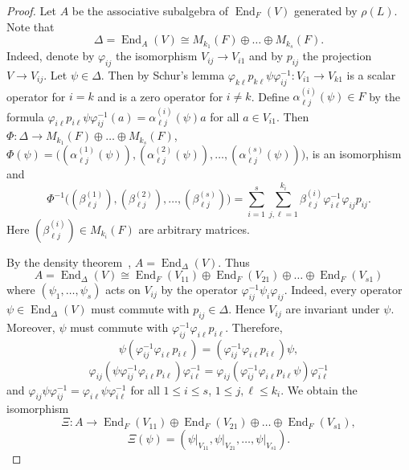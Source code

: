 \documentclass[12pt, reqno, a4paper]{amsart}
\theoremstyle{plain}
\theoremstyle{remark}
\theoremstyle{definition}
\begin{document}
\begin{proof}
Let $A$ be the associative subalgebra of $\operatorname{End}_F(V)$
generated by $\rho(L)$. Note that
$$\Delta=\operatorname{End}_A(V)\cong M_{k_1}(F)\oplus \ldots \oplus M_{k_s}(F).$$
Indeed, denote by $\varphi_{ij}$  the isomorphism $V_{ij}\to V_{i1}$
and by $p_{ij}$ the projection $V \to V_{ij}$.
Let $\psi \in \Delta$.
Then by Schur's lemma $\varphi_{k\ell}p_{k\ell}\psi\varphi_{ij}^{-1}
\colon V_{i1} \to V_{k1}$
is a scalar operator for $i=k$  and is a zero operator
for $i \ne k$. Define $\alpha^{(i)}_{\ell j}(\psi)
\in F$ by the formula
$\varphi_{i\ell}p_{i\ell}\psi\varphi_{ij}^{-1}(a)=\alpha^{(i)}_{\ell j}(\psi)a$
for all $a \in V_{i1}$.
Then $\Phi \colon \Delta \to M_{k_1}(F)\oplus \ldots \oplus M_{k_s}(F)$,
$\Phi(\psi)=\bigl((\alpha^{(1)}_{\ell j}(\psi)), (\alpha^{(2)}_{\ell j}(\psi)),
\ldots, (\alpha^{(s)}_{\ell j}(\psi))\bigr)$, is an isomorphism
and $$\Phi^{-1}\bigl((\beta^{(1)}_{\ell j}), (\beta^{(2)}_{\ell j}),
\ldots, (\beta^{(s)}_{\ell j})\bigr)
= \sum_{i=1}^{s}\sum_{j,\ell=1}^{k_i}
 \beta^{(i)}_{\ell j} \varphi^{-1}_{i\ell}\varphi_{ij}p_{ij}.$$
 Here $(\beta^{(i)}_{\ell j}) \in M_{k_i}(F)$ are arbitrary matrices.

 By the density theorem~\cite[Section 4.3]{Jacobson},
 $A=\operatorname{End}_\Delta(V)$.
Thus $$A=\operatorname{End}_\Delta(V)\cong \operatorname{End}_F(V_{11}) \oplus \operatorname{End}_F(V_{21})
\oplus \ldots \oplus \operatorname{End}_F(V_{s1})$$
where $(\psi_1, \ldots, \psi_s)$ acts on $V_{ij}$ by the
operator $\varphi^{-1}_{ij}\psi_i\varphi_{ij}$. Indeed, every operator $\psi \in \operatorname{End}_\Delta(V)$
must commute with $p_{ij} \in \Delta$. Hence $V_{ij}$ are invariant
under $\psi$. Moreover, $\psi$ must commute with $\varphi^{-1}_{ij}\varphi_{i\ell} p_{i\ell}$.
Therefore, $$\psi(\varphi^{-1}_{ij}\varphi_{i\ell}p_{i\ell}) = (\varphi^{-1}_{ij}\varphi_{i\ell} p_{i\ell})\psi,$$
$$\varphi_{ij}(\psi \varphi^{-1}_{ij}\varphi_{i\ell} p_{i\ell})
\varphi_{i\ell}^{-1} = \varphi_{ij}(\varphi^{-1}_{ij}\varphi_{i\ell} p_{i\ell}\psi)\varphi_{i\ell}^{-1}$$
 and
$\varphi_{ij} \psi \varphi^{-1}_{ij} = \varphi_{i\ell} \psi\varphi_{i\ell}^{-1}$
for all $1\leqslant i \leqslant s$, $1 \leqslant j,\ell \leqslant k_i$.
We obtain the isomorphism $$\Xi \colon A
\to \operatorname{End}_F(V_{11}) \oplus \operatorname{End}_F(V_{21})
\oplus \ldots \oplus \operatorname{End}_F(V_{s1}),$$
 $$\Xi(\psi) = (\psi\bigl|_{V_{11}}, \psi\bigl|_{V_{21}},
 \ldots, \psi\bigl|_{V_{s1}}).$$


\end{proof}
\end{document}
